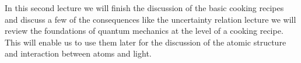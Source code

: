 In this second lecture we will finish the discussion of the basic cooking recipes and discuss a few of the consequences like the uncertainty relation  lecture we will review the foundations of quantum mechanics at the level of a cooking recipe. This will enable us to use them later for the discussion of the atomic structure and interaction between atoms and light.